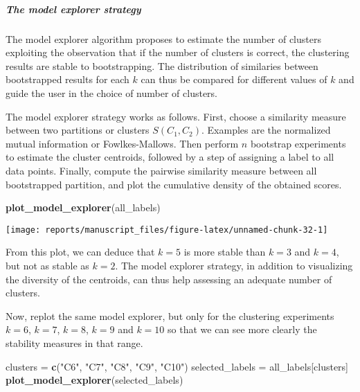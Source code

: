 \documentclass[9pt,a4paper,]{extarticle}
\newenvironment{Shaded}{\begin{snugshade}}{\end{snugshade}}
\newcommand{\KeywordTok}[1]{\textcolor[rgb]{0.13,0.29,0.53}{\textbf{#1}}}
\newcommand{\NormalTok}[1]{#1}
\newcommand{\StringTok}[1]{\textcolor[rgb]{0.31,0.60,0.02}{#1}}
\begin{document}
\hypertarget{the-model-explorer-strategy}{%
\subparagraph{The model explorer strategy}\label{the-model-explorer-strategy}}

The model explorer algorithm \citep{ben-hur:stability} proposes to estimate the
number of clusters exploiting the observation that if the number of clusters
is correct, the clustering results are stable to bootstrapping. The
distribution of similaries between bootstrapped results for each \(k\) can thus
be compared for different values of \(k\) and guide the user in the choice of
number of clusters.

The model explorer strategy works as follows. First, choose a similarity
measure between two partitions or clusters \(S(C_1, C_2)\). Examples are the
normalized mutual information or Fowlkes-Mallows. Then perform \(n\) bootstrap
experiments to estimate the cluster centroids, followed by a step of assigning
a label to all data points. Finally, compute the pairwise similarity measure
between all bootstrapped partition, and plot the cumulative density of the
obtained scores.

\begin{Shaded}
\begin{Highlighting}[]
\KeywordTok{plot_model_explorer}\NormalTok{(all_labels)}
\end{Highlighting}
\end{Shaded}

\begin{center}\texttt{[image: reports/manuscript\_files/figure-latex/unnamed-chunk-32-1]} \end{center}

From this plot, we can deduce that \(k=5\) is more stable than \(k=3\) and \(k=4\),
but not as stable as \(k=2\). The model explorer strategy, in addition to
visualizing the diversity of the centroids, can thus help assessing an
adequate number of clusters.

Now, replot the same model explorer, but only for the clustering experiments
\(k=6\), \(k=7\), \(k=8\), \(k=9\) and \(k=10\) so that we can see more clearly the stability
measures in that range.

\begin{Shaded}
\begin{Highlighting}[]
\NormalTok{clusters =}\StringTok{ }\KeywordTok{c}\NormalTok{(}\StringTok{"C6"}\NormalTok{, }\StringTok{"C7"}\NormalTok{, }\StringTok{"C8"}\NormalTok{, }\StringTok{"C9"}\NormalTok{, }\StringTok{"C10"}\NormalTok{)}
\NormalTok{selected_labels =}\StringTok{ }\NormalTok{all_labels[clusters]}
\KeywordTok{plot_model_explorer}\NormalTok{(selected_labels)}
\end{Highlighting}
\end{Shaded}
\end{document}

